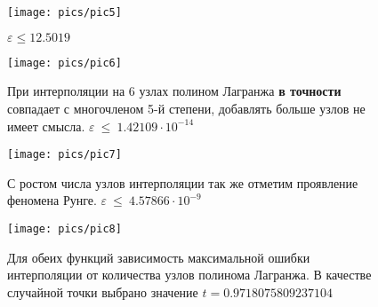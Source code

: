 \begin{figure}[H]
    \centering
    \caption{$\varepsilon \le 12.5019$}
    \texttt{[image: pics/pic5]}
    \label{pic:5}
\end{figure}

\begin{figure}[H]
    \centering
    \caption{При интерполяции на 6 узлах полином Лагранжа {\bf в точности} совпадает с многочленом 5-й степени, добавлять больше узлов не имеет смысла. $\varepsilon~\le~1.42109\cdot10^{-14}$}
    \texttt{[image: pics/pic6]}
    \label{pic:6}
\end{figure}

\begin{figure}[H]
    \centering
    \caption{С ростом числа узлов интерполяции так же отметим проявление феномена Рунге. $\varepsilon~\le~4.57866\cdot10^{-9}$}
    \texttt{[image: pics/pic7]}
    \label{pic:7}
\end{figure}

\begin{figure}[H]
    \centering
    \caption{Для обеих функций зависимость максимальной ошибки интерполяции от количества узлов полинома Лагранжа. В качестве случайной точки выбрано значение $t = 0.9718075809237104$}
    \texttt{[image: pics/pic8]}
    \label{pic:8}
\end{figure}
